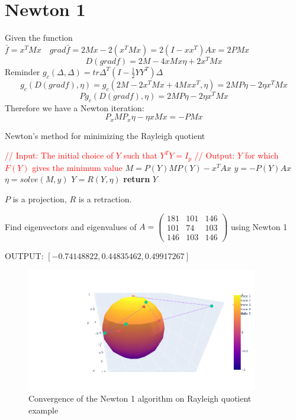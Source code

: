 \documentclass[11pt,a4paper]{report}
\begin{document}
\section{Newton 1}
Given the function $\bar{f}= x^T M x \quad grad \bar{f} = 2 M x  - 2 (x^T M x) = 2 (I - xx^T) A x = 2 P M x$
$$ D(grad f) = 2M - 4 x M x \eta + 2 x^T M x $$
Reminder $g_c(\Delta,\Delta) = tr \Delta^T (I - \frac{1}{2} Y Y^T) \Delta$
$$ g_c (D(grad f), \eta ) = g_c(2M - 2x^T M x + 4M x x^T, \eta) = 2 M  P \eta  - 2 \eta x^T M x  $$
$$ P g_c(D(grad f), \eta) = 2 M P \eta - 2 \eta x^T M x$$
Therefore we have a Newton iteration:
$$ P_x M P_x \eta - \eta x M x = - P M x$$
\begin{algorithm}
\caption{Newton's method for minimizing the Rayleigh quotient}
    \begin{algorithmic}[1]
        \State \textcolor{red}{// Input: The initial choice of $Y$ such that $Y^T Y = I_p$}
        \State \textcolor{red}{// Output: $Y$ for which $F(Y)$ gives the minimum value}
        \State $M = P(Y) M P(Y) - x^T A x $
        \State $y = - P(Y) A x$
        \State $\eta = solve(M,y)$
        \State $Y = R(Y, \eta)$
        \EndWhile
        \State \textbf{return} $Y$
        \EndProcedure
    \end{algorithmic}
\end{algorithm}
$P$ is a projection, $R$ is a retraction.
\begin{Ex}
    Find eigenvectors and eigenvalues of $A = \begin{pmatrix} 181 & 101 & 146 \\ 101 & 74 & 103 \\ 146 & 103 & 146 \end{pmatrix} $ using Newton 1
\end{Ex}
OUTPUT: $ [-0.74148822,  0.44835462,  0.49917267] $
\begin{figure}[h] \label{gradR1}
    \centering
    \includegraphics[width=0.90\textwidth]{newton1.png}
    \caption{Convergence of the Newton 1 algorithm on Rayleigh quotient example}
\end{figure}
\end{document}
